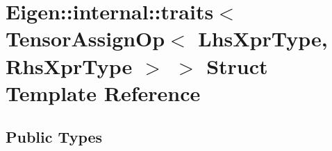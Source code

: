 \hypertarget{struct_eigen_1_1internal_1_1traits_3_01_tensor_assign_op_3_01_lhs_xpr_type_00_01_rhs_xpr_type_01_4_01_4}{}\section{Eigen\+:\+:internal\+:\+:traits$<$ Tensor\+Assign\+Op$<$ Lhs\+Xpr\+Type, Rhs\+Xpr\+Type $>$ $>$ Struct Template Reference}
\label{struct_eigen_1_1internal_1_1traits_3_01_tensor_assign_op_3_01_lhs_xpr_type_00_01_rhs_xpr_type_01_4_01_4}
\subsection*{Public Types}
